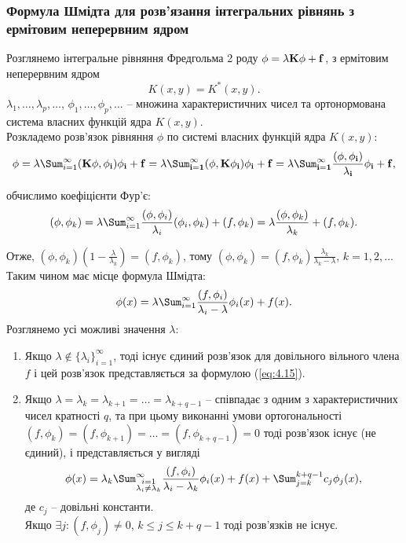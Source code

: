 \subsubsection{Формула Шмідта для розв’язання інтегральних рівнянь з ермітовим неперервним ядром}

Розглянемо інтегральне рівняння Фредгольма 2 роду $\phi = \lambda \bf{K} \phi + f$, з ермітовим неперервним ядром 
\begin{equation} 
	\label{eq:4.14} 
	K(x, y) = K^* (x, y).
\end{equation}
$\lambda_1, \ldots, \lambda_p, \ldots$, $\phi_1, \ldots, \phi_p, \ldots$ -- множина характеристичних чисел та ортонормована система власних функцій ядра $K(x, y)$. \\

Розкладемо розв’язок рівняння $\phi$ по системі власних функцій ядра $K(x, y)$:
\[ \phi = \lambda \Sum_{i = 1}^\infty (\bf{K}\phi, \phi_i) \phi_i + f = \lambda \Sum_{i = 1}^\infty (\phi, \bf{K} \phi_i) \phi_i + f = \lambda \Sum_{i = 1}^\infty \dfrac{(\phi, \phi_i)}{\lambda_i} \phi_i + f, \]

обчислимо коефіцієнти Фур'є: \[ (\phi, \phi_k) = \lambda \Sum_{i = 1}^\infty \dfrac{(\phi, \phi_i)}{\lambda_i} (\phi_i, \phi_k) + (f, \phi_k) = \lambda \dfrac{(\phi, \phi_k)}{\lambda_k} + (f, \phi_k). \]

Отже, $(\phi, \phi_k) \left(1 - \frac{\lambda}{\lambda_k}\right) = (f, \phi_k)$, тому $(\phi, \phi_k) = (f, \phi_k) \frac{\lambda_k}{\lambda_k - \lambda}$, $k = 1, 2, \ldots$ \\

Таким чином має місце формула Шмідта:
\begin{equation}
	\label{eq:4.15}
	\phi(x) = \lambda \Sum_{i = 1}^\infty \dfrac{(f, \phi_i)}{\lambda_i - \lambda} \phi_i(x) + f(x).
\end{equation}
Розглянемо усі можливі значення $\lambda$:
\begin{enumerate}
	\item Якщо $\lambda \notin \{\lambda_i\}_{i=1}^\infty$, тоді існує єдиний розв'язок для довільного вільного члена $f$ і цей розв'язок представляється за формулою (\ref{eq:4.15}).
	\item Якщо $\lambda = \lambda_k = \lambda_{k + 1} = \ldots = \lambda_{k + q - 1}$ -- співпадає з одним з характеристичних чисел кратності $q$, та при цьому виконанні умови ортогональності $(f, \phi_k) = (f, \phi_{k + 1}) = \ldots = (f, \phi_{k + q - 1}) = 0$ тоді розв'язок існує (не єдиний), і представляється у вигляді 
	\begin{equation}
		\label{eq:4.16}
		\phi(x) = \lambda_k \Sum_{\substack{i = 1 \\ \lambda_i \ne \lambda_k}}^\infty \dfrac{(f, \phi_i)}{\lambda_i - \lambda_k} \phi_i(x) + f(x) + \Sum_{j = k}^{k + q - 1} c_j \phi_j(x),
	\end{equation}
	де $c_j$ -- довільні константи. \\

	Якщо $\exists j: (f, \phi_j) \ne 0$, $k \le j \le k + q - 1$ тоді розв'язків не існує.
\end{enumerate}

